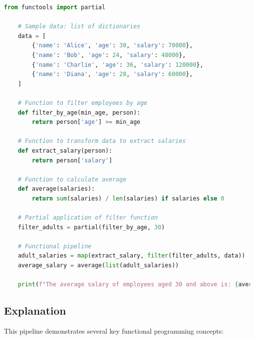 \documentclass[a4paper]{article}
\begin{document}
\begin{lstlisting}[language=Python, caption=Functional Data Processing Pipeline]
    from functools import partial

    # Sample data: list of dictionaries
    data = [
        {'name': 'Alice', 'age': 30, 'salary': 70000},
        {'name': 'Bob', 'age': 24, 'salary': 48000},
        {'name': 'Charlie', 'age': 36, 'salary': 120000},
        {'name': 'Diana', 'age': 28, 'salary': 60000},
    ]

    # Function to filter employees by age
    def filter_by_age(min_age, person):
        return person['age'] >= min_age

    # Function to transform data to extract salaries
    def extract_salary(person):
        return person['salary']

    # Function to calculate average
    def average(salaries):
        return sum(salaries) / len(salaries) if salaries else 0

    # Partial application of filter function
    filter_adults = partial(filter_by_age, 30)

    # Functional pipeline
    adult_salaries = map(extract_salary, filter(filter_adults, data))
    average_salary = average(list(adult_salaries))

    print(f"The average salary of employees aged 30 and above is: {average_salary}")
\end{lstlisting}

\subsection{Explanation}
This pipeline demonstrates several key functional programming concepts:
\end{document}
